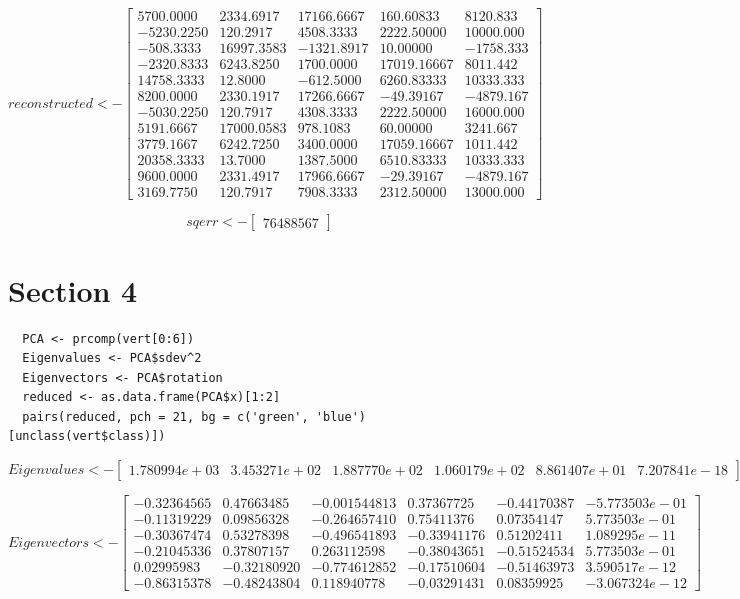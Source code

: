 \documentclass{report}
\begin{document}
\[
  reconstructed <- 
  \begin{bmatrix}
    5700.0000 & 2334.6917 & 17166.6667 & 160.60833 & 8120.833 \\
    -5230.2250 & 120.2917 & 4508.3333 & 2222.50000 & 10000.000 \\
    -508.3333 & 16997.3583 & -1321.8917 & 10.00000 & -1758.333 \\
    -2320.8333 & 6243.8250 & 1700.0000 & 17019.16667 & 8011.442 \\
    14758.3333 & 12.8000 & -612.5000 & 6260.83333 & 10333.333 \\
    8200.0000 & 2330.1917 & 17266.6667 & -49.39167 & -4879.167 \\
    -5030.2250 & 120.7917 & 4308.3333 & 2222.50000 & 16000.000 \\
    5191.6667 & 17000.0583 & 978.1083 & 60.00000 & 3241.667 \\
    3779.1667 & 6242.7250 & 3400.0000 & 17059.16667 & 1011.442 \\
    20358.3333 & 13.7000 & 1387.5000 & 6510.83333 & 10333.333 \\
    9600.0000 & 2331.4917 & 17966.6667 & -29.39167 & -4879.167 \\
    3169.7750 & 120.7917 & 7908.3333 & 2312.50000 & 13000.000
  \end{bmatrix}
\]

\[
  sqerr <- 
  \begin{bmatrix}
    76488567
  \end{bmatrix}
\]

\chapter{Section 4}

\begin{verbatim}	
  PCA <- prcomp(vert[0:6])
  Eigenvalues <- PCA$sdev^2
  Eigenvectors <- PCA$rotation
  reduced <- as.data.frame(PCA$x)[1:2]
  pairs(reduced, pch = 21, bg = c('green', 'blue')[unclass(vert$class)])
\end{verbatim}

\[
  Eigenvalues <- 
  \begin{bmatrix}
    1.780994e+03 & 3.453271e+02 & 1.887770e+02 & 1.060179e+02 & 8.861407e+01 & 7.207841e-18
  \end{bmatrix}
\]

\[
  Eigenvectors <- 
  \begin{bmatrix}
    -0.32364565 & 0.47663485 & -0.001544813 & 0.37367725 & -0.44170387 & -5.773503e-01 \\
    -0.11319229 & 0.09856328 & -0.264657410 & 0.75411376 & 0.07354147  & 5.773503e-01 \\
    -0.30367474 & 0.53278398 & -0.496541893 & -0.33941176 & 0.51202411 & 1.089295e-11 \\
    -0.21045336 & 0.37807157 & 0.263112598 & -0.38043651 & -0.51524534 & 5.773503e-01 \\
    0.02995983 & -0.32180920 & -0.774612852 & -0.17510604 & -0.51463973 & 3.590517e-12 \\
    -0.86315378 & -0.48243804 & 0.118940778 & -0.03291431 & 0.08359925 & -3.067324e-12
  \end{bmatrix}
\]
\end{document}
